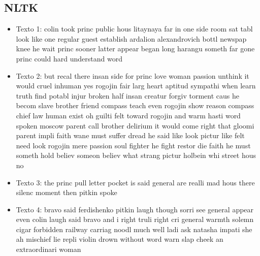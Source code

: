 \documentclass[a4paper,twocolumn]{article}
\begin{document}
    \subsection{NLTK}\label{subsec:nltk_out}
    \begin{itemize}
        \item Texto 1: colin took princ public hous litaynaya far in one side room sat tabl look like one regular guest establish ardalion alexandrovich bottl newspap knee he wait princ sooner latter appear began long harangu someth far gone princ could hard understand word
        \item Texto 2: but recal there insan side for princ love woman passion unthink it would cruel inhuman yes rogojin fair larg heart aptitud sympathi when learn truth find potabl injur broken half insan creatur forgiv torment caus he becom slave brother friend compass teach even rogojin show reason compass chief law human exist oh guilti felt toward rogojin and warm hasti word spoken moscow parent call brother delirium it would come right that gloomi parent impli faith wane must suffer dread he said like look pictur like felt need look rogojin mere passion soul fighter he fight restor die faith he must someth hold believ someon believ what strang pictur holbein whi street hous no
        \item Texto 3: the princ pull letter pocket is said general are realli mad hous there silenc moment then pitkin spoke
        \item Texto 4: bravo said ferdishenko pitkin laugh though sorri see general appear even colin laugh said bravo and i right truli right cri general warmth solemn cigar forbidden railway carriag noodl much well ladi ask natasha impati she ah mischief lie repli violin drown without word warn slap cheek an extraordinari woman
    \end{itemize}
\end{document}
